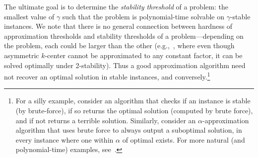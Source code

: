 The ultimate goal is to determine the {\em stability threshold} of a
problem:
the smallest value of $\gamma$ such that the problem is
  polynomial-time solvable on $\gamma$-stable instances.
We note that there is no general connection between hardness of
approximation thresholds and stability thresholds of a
problem---depending on  the
problem, each could be larger than the other (e.g.,~\cite{balcan2015k}, where even though asymmetric $k$-center cannot be approximated to any
constant factor, it can be solved optimally under 2-stability).
%
Thus a good approximation algorithm need not recover an optimal
solution in stable instances, and conversely.\footnote{%
For a silly example, consider an algorithm that
  checks if an instance is stable (by brute-force), if so returns the
  optimal solution (computed by brute force), and if not returns a
  terrible solution.  Similarly, consider an $\alpha$-approximation
  algorithm that uses brute force to always output a suboptimal
  solution, in every instance where one   within $\alpha$ of optimal
  exists.  For more natural (and polynomial-time) examples,
  see~\cite{balcan2015k,makarychevSODA14}.}






